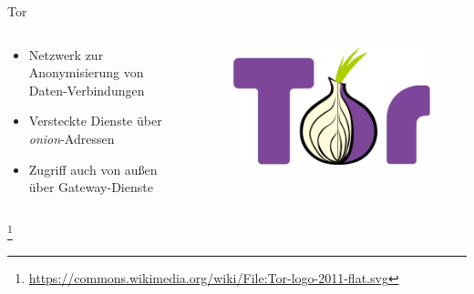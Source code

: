 \documentclass[10pt]{beamer}
\begin{document}
\begin{frame}{Tor}
	\begin{columns}
		\begin{column}{7cm}		
			\begin{itemize}
				\item Netzwerk zur Anonymisierung von Daten-Verbindungen
				\item Versteckte Dienste über \textit{onion}-Adressen
				\item Zugriff auch von außen über Gateway-Dienste
			\end{itemize}
		\end{column}
		\begin{column}{4cm}
			\begin{figure}[p]
				\centering
				\includegraphics[scale=0.2]{tor.png}
			\end{figure}
		\end{column}
	\end{columns}
	\let\thefootnote\relax\footnote{\url{https://commons.wikimedia.org/wiki/File:Tor-logo-2011-flat.svg}}
\end{frame}
\end{document}
